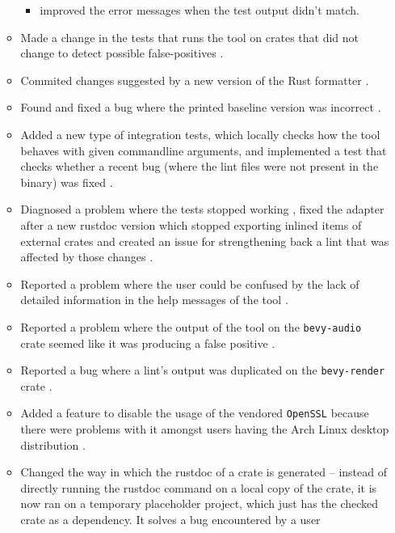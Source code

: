 \documentclass[licencjacka,en]{pracamgr}
\begin{document}
\begin{itemize}
\begin{itemize}
\begin{itemize}
					\item improved the error messages when the test output didn't match.
				\end{itemize}
			\item Made a change in the tests that runs the tool on crates that did not change
				to detect possible false-positives \cite{pr_run_lints_nonchanged_crates}.
			\item Commited changes suggested by a new version of the Rust formatter \cite{pr_clippy_lint}.
			\item Found and fixed a bug where the printed baseline version
				was incorrect \cite{pr_bugfix_printed_baseline}.
			\item Added a new type of integration tests, which locally checks
				how the tool behaves with given commandline arguments,
				and implemented a test that checks whether a recent bug
				(where the lint files were not present in the binary)
				was fixed \cite{pr_run_cargo_build}.
			\item Diagnosed a problem where the tests stopped working \cite{issue_tests_fail_unknown},
				fixed the adapter after a new rustdoc version which
				stopped exporting inlined items of external crates \cite{pr_rustdoc_trait_incompatibility}
				and created an issue for strengthening back a lint that was
				affected by those changes \cite{issue_strengthen_back}.
			\item Reported a problem where the user could be confused by the lack of
				detailed information in the help messages of the tool \cite{issue_help_messages}.
			\item Reported a problem where the output of the tool on the \texttt{bevy-audio} crate
				seemed like it was producing a false positive \cite{issue_bevy_audio}.
			\item Reported a bug where a lint's output was duplicated on the
				\texttt{bevy-render} crate \cite{issue_duplicated_failure}.
			\item Added a feature to disable the usage of the vendored \texttt{OpenSSL} \cite{pr_openssl}
				because there were problems with it amongst users having
				the Arch Linux desktop distribution \cite{issue_openssl}.
			\item Changed the way in which the rustdoc of a crate is generated
				-- instead of directly running the rustdoc command on a local copy of the crate,
				it is now ran on a temporary placeholder project,
				which just has the checked crate as a dependency.
				It solves a bug encountered by a user \cite{issue_apple_bitflags}

\end{itemize}
\end{itemize}
\end{document}
